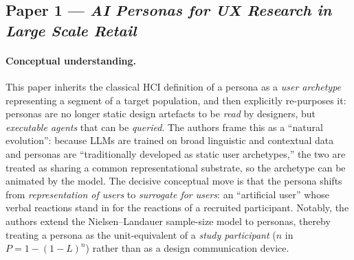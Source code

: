

\subsection*{Paper 1 --- \textit{AI Personas for UX Research in Large Scale Retail}}

\paragraph{Conceptual understanding.}
This paper inherits the classical HCI definition of a persona as a
\emph{user archetype} representing a segment of a target population, and then
explicitly re-purposes it: personas are no longer static design artefacts to be
\emph{read} by designers, but \emph{executable agents} that can be
\emph{queried}. The authors frame this as a ``natural evolution'': because LLMs
are trained on broad linguistic and contextual data and personas are
``traditionally developed as static user archetypes,'' the two are treated as
sharing a common representational substrate, so the archetype can be animated by
the model. The decisive conceptual move is that the persona shifts from
\emph{representation of users} to \emph{surrogate for users}: an ``artificial
user'' whose verbal reactions stand in for the reactions of a recruited
participant. Notably, the authors extend the Nielsen--Landauer sample-size model
to personas, thereby treating a persona as the unit-equivalent of a
\emph{study participant} ($n$ in $P = 1-(1-L)^n$) rather than as a design
communication device.

